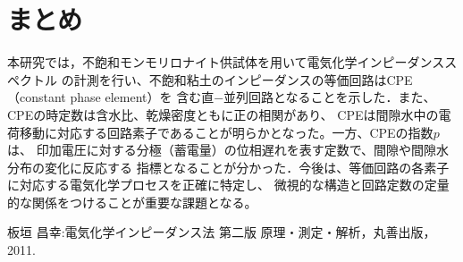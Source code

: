 \documentclass{jsce}
\begin{document}
\section{まとめ}
本研究では，不飽和モンモリロナイト供試体を用いて電気化学インピーダンススペクトル
の計測を行い、不飽和粘土のインピーダンスの等価回路はCPE（constant phase element）を
含む直−並列回路となることを示した．また、CPEの時定数は含水比、乾燥密度ともに正の相関があり、
CPEは間隙水中の電荷移動に対応する回路素子であることが明らかとなった。一方、CPEの指数$p$は、
印加電圧に対する分極（蓄電量）の位相遅れを表す定数で、間隙や間隙水分布の変化に反応する
指標となることが分かった．今後は、等価回路の各素子に対応する電気化学プロセスを正確に特定し、
微視的な構造と回路定数の定量的な関係をつけることが重要な課題となる。
\begin{thebibliography}{99}
\begin{spacing}{1.175}
	板垣 昌幸:電気化学インピーダンス法 第二版 原理・測定・解析，丸善出版， 2011. 
\end{spacing}
\end{thebibliography}
\end{document}
